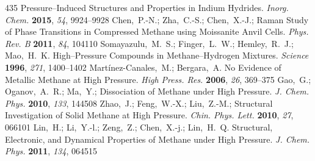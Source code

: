 \documentclass[12pt,letterpaper,oneside]{article}
\begin{document}
\begin{mcitethebibliography}{435}
  Pressure--Induced Structures and Properties in Indium Hydrides. \emph{Inorg.
  Chem.} \textbf{2015}, \emph{54}, 9924--9928\relax
\mciteBstWouldAddEndPuncttrue
\mciteSetBstMidEndSepPunct{\mcitedefaultmidpunct}
{\mcitedefaultendpunct}{\mcitedefaultseppunct}\relax
\EndOfBibitem
{}
Chen,~P.-N.; Zha,~C.-S.; Chen,~X.-J.; 
  Raman Study of Phase Transitions in Compressed Methane using Moissanite Anvil
  Cells. \emph{Phys. Rev. B} \textbf{2011}, \emph{84}, 104110\relax
\mciteBstWouldAddEndPuncttrue
\mciteSetBstMidEndSepPunct{\mcitedefaultmidpunct}
{\mcitedefaultendpunct}{\mcitedefaultseppunct}\relax
\EndOfBibitem
{}
Somayazulu,~M.~S.; Finger,~L.~W.; Hemley,~R.~J.; Mao,~H.~K. High--Pressure
  Compounds in Methane--Hydrogen Mixtures. \emph{Science} \textbf{1996},
  \emph{271}, 1400--1402\relax
\mciteBstWouldAddEndPuncttrue
\mciteSetBstMidEndSepPunct{\mcitedefaultmidpunct}
{\mcitedefaultendpunct}{\mcitedefaultseppunct}\relax
\EndOfBibitem
{}
Mart{\'i}nez-Canales,~M.; Bergara,~A. No Evidence of Metallic Methane at High
  Pressure. \emph{High Press. Res.} \textbf{2006}, \emph{26}, 369--375\relax
\mciteBstWouldAddEndPuncttrue
\mciteSetBstMidEndSepPunct{\mcitedefaultmidpunct}
{\mcitedefaultendpunct}{\mcitedefaultseppunct}\relax
\EndOfBibitem
{}
Gao,~G.; Oganov,~A.~R.; Ma,~Y.;   Dissociation
  of Methane under High Pressure. \emph{J. Chem. Phys.} \textbf{2010},
  \emph{133}, 144508\relax
\mciteBstWouldAddEndPuncttrue
\mciteSetBstMidEndSepPunct{\mcitedefaultmidpunct}
{\mcitedefaultendpunct}{\mcitedefaultseppunct}\relax
\EndOfBibitem
{}
Zhao,~J.; Feng,~W.-X.; Liu,~Z.-M.;   Structural
  Investigation of Solid Methane at High Pressure. \emph{Chin. Phys. Lett.}
  \textbf{2010}, \emph{27}, 066101\relax
\mciteBstWouldAddEndPuncttrue
\mciteSetBstMidEndSepPunct{\mcitedefaultmidpunct}
{\mcitedefaultendpunct}{\mcitedefaultseppunct}\relax
\EndOfBibitem
{}
Lin,~H.; Li,~Y.-l.; Zeng,~Z.; Chen,~X.-j.; Lin,~H.~Q. Structural, Electronic,
  and Dynamical Properties of Methane under High Pressure. \emph{J. Chem.
  Phys.} \textbf{2011}, \emph{134}, 064515\relax

\end{mcitethebibliography}
\end{document}
